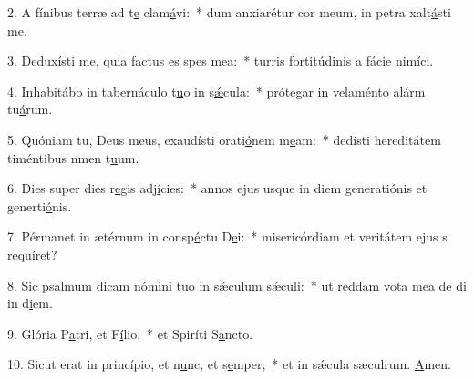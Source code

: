2. A fínibus terræ ad t\uline{e} clam\uline{á}vi:~* dum anxiarétur cor meum, in petra xalt\uline{á}sti me.\par 
3. Deduxísti me, quia factus \uline{e}s spes m\uline{e}a:~* turris fortitúdinis a fácie nim\uline{í}ci.\par 
4. Inhabitábo in tabernáculo t\uline{u}o in s\uline{ǽ}cula:~* prótegar in velaménto alárm tu\uline{á}rum.\par 
5. Quóniam tu, Deus meus, exaudísti orati\uline{ó}nem m\uline{e}am:~* dedísti hereditátem timéntibus nmen t\uline{u}um.\par 
6. Dies super dies r\uline{e}gis adj\uline{í}cies:~* annos ejus usque in diem generatiónis et generti\uline{ó}nis.\par 
7. Pérmanet in ætérnum in consp\uline{é}ctu D\uline{e}i:~* misericórdiam et veritátem ejus s re\uline{quí}ret?\par 
8. Sic psalmum dicam nómini tuo in s\uline{ǽ}culum s\uline{ǽ}culi:~* ut reddam vota mea de di in d\uline{i}em.\par 
9. Glória P\uline{a}tri, et F\uline{í}lio,~* et Spiríti S\uline{a}ncto.\par 
10. Sicut erat in princípio, et n\uline{u}nc, et s\uline{e}mper,~* et in sǽcula sæculrum. \uline{A}men.\par 
